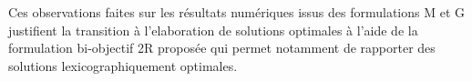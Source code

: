 \documentclass[preprint,12pt,authoryear]{elsarticle}
\begin{document}
Ces observations faites sur les résultats numériques issus des formulations M et G justifient la transition à l'elaboration de solutions optimales à l'aide de la formulation bi-objectif 2R proposée qui permet notamment de rapporter des solutions lexicographiquement optimales.



 \color{black}
 
\end{document}

